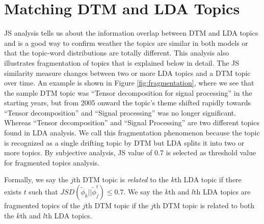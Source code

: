 \documentclass[a4paper]{report}
\begin{document}
\section{Matching DTM and LDA Topics}
JS analysis tells us about the information overlap between DTM and LDA topics and is a good way to confirm weather the topics are similar in both models or that the topic-word distributions are totally different. This analysis also illustrates fragmentation of topics that is explained below in detail. The JS similarity measure changes between two or more LDA topics and a DTM topic over time. An example is shown in Figure \ref{fig:fragmentation}, where we see that the sample DTM topic was ``Tensor decomposition for signal processing'' in the starting years, but from 2005 onward the topic's theme shifted rapidly towards ``Tensor decomposition'' and ``Signal processing'' was no longer significant. Whereas ``Tensor decomposition'' and ``Signal Processing'' are two different topics found in LDA analysis. We call this fragmentation phenomenon because the topic is recognized as a single drifting topic by DTM but LDA splits it into two or more topics. By subjective analysis, JS value of 0.7 is selected as threshold value for fragmented topics analysis.

Formally, we say the $j$th DTM topic is \textit{related} to the $k$th LDA topic if there exists $t$ such that $JSD(\tilde{\phi}_k || \tilde{\phi}_j^t) \leq 0.7$.
We say the $k$th and $l$th LDA topics are fragmented topics of the $j$th DTM topic if the $j$th DTM topic is related to both the $k$th and $l$th LDA topics.
\end{document}

